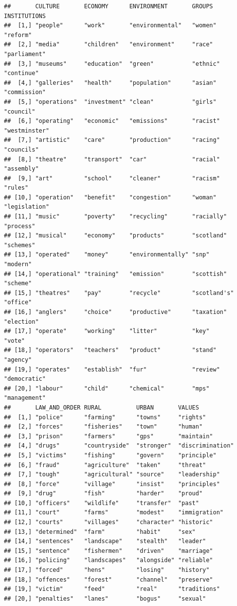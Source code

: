 \documentclass[
]{book}
\begin{document}
\begin{verbatim}
##       CULTURE       ECONOMY      ENVIRONMENT       GROUPS       INSTITUTIONS 
##  [1,] "people"      "work"       "environmental"   "women"      "reform"     
##  [2,] "media"       "children"   "environment"     "race"       "parliament" 
##  [3,] "museums"     "education"  "green"           "ethnic"     "continue"   
##  [4,] "galleries"   "health"     "population"      "asian"      "commission" 
##  [5,] "operations"  "investment" "clean"           "girls"      "council"    
##  [6,] "operating"   "economic"   "emissions"       "racist"     "westminster"
##  [7,] "artistic"    "care"       "production"      "racing"     "councils"   
##  [8,] "theatre"     "transport"  "car"             "racial"     "assembly"   
##  [9,] "art"         "school"     "cleaner"         "racism"     "rules"      
## [10,] "operation"   "benefit"    "congestion"      "woman"      "legislation"
## [11,] "music"       "poverty"    "recycling"       "racially"   "process"    
## [12,] "musical"     "economy"    "products"        "scotland"   "schemes"    
## [13,] "operated"    "money"      "environmentally" "snp"        "modern"     
## [14,] "operational" "training"   "emission"        "scottish"   "scheme"     
## [15,] "theatres"    "pay"        "recycle"         "scotland's" "office"     
## [16,] "anglers"     "choice"     "productive"      "taxation"   "election"   
## [17,] "operate"     "working"    "litter"          "key"        "vote"       
## [18,] "operators"   "teachers"   "product"         "stand"      "agency"     
## [19,] "operates"    "establish"  "fur"             "review"     "democratic" 
## [20,] "labour"      "child"      "chemical"        "mps"        "management" 
##       LAW_AND_ORDER RURAL          URBAN       VALUES          
##  [1,] "police"      "farming"      "towns"     "rights"        
##  [2,] "forces"      "fisheries"    "town"      "human"         
##  [3,] "prison"      "farmers"      "gps"       "maintain"      
##  [4,] "drugs"       "countryside"  "stronger"  "discrimination"
##  [5,] "victims"     "fishing"      "govern"    "principle"     
##  [6,] "fraud"       "agriculture"  "taken"     "threat"        
##  [7,] "tough"       "agricultural" "source"    "leadership"    
##  [8,] "force"       "village"      "insist"    "principles"    
##  [9,] "drug"        "fish"         "harder"    "proud"         
## [10,] "officers"    "wildlife"     "transfer"  "past"          
## [11,] "court"       "farms"        "modest"    "immigration"   
## [12,] "courts"      "villages"     "character" "historic"      
## [13,] "determined"  "farm"         "habit"     "sex"           
## [14,] "sentences"   "landscape"    "stealth"   "leader"        
## [15,] "sentence"    "fishermen"    "driven"    "marriage"      
## [16,] "policing"    "landscapes"   "alongside" "reliable"      
## [17,] "forced"      "hens"         "losing"    "history"       
## [18,] "offences"    "forest"       "channel"   "preserve"      
## [19,] "victim"      "feed"         "real"      "traditions"    
## [20,] "penalties"   "lanes"        "bogus"     "sexual"
\end{verbatim}
\end{document}
